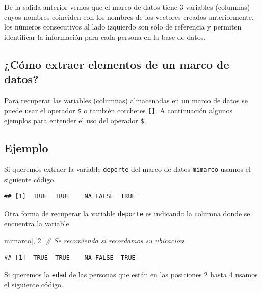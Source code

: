 \documentclass[10pt,]{krantz}
\makeatletter
\newenvironment{Shaded}{\begin{snugshade}}{\end{snugshade}}
\newcommand{\DecValTok}[1]{\textcolor[rgb]{0.00,0.00,0.81}{{#1}}}
\newcommand{\CommentTok}[1]{\textcolor[rgb]{0.56,0.35,0.01}{\textit{{#1}}}}
\newcommand{\NormalTok}[1]{{#1}}
\newenvironment{kframe}{%
\medskip{}
\setlength{\fboxsep}{.8em}
 \def\at@end@of@kframe{}%
 \ifinner\ifhmode%
  \def\at@end@of@kframe{\end{minipage}}%
  \begin{minipage}{\columnwidth}%
 \fi\fi%
 \def\FrameCommand##1{\hskip\@totalleftmargin \hskip-\fboxsep
 \colorbox{shadecolor}{##1}\hskip-\fboxsep
     \hskip-\linewidth \hskip-\@totalleftmargin \hskip\columnwidth}%
 \MakeFramed {\advance\hsize-\width
   \@totalleftmargin\z@ \linewidth\hsize
   \@setminipage}}%
 {\par\unskip\endMakeFramed%
 \at@end@of@kframe}
\renewenvironment{Shaded}{\begin{kframe}}{\end{kframe}}
\makeatother
\begin{document}
De la salida anterior vemos que el marco de datos tiene 3 variables
(columnas) cuyos nombres coinciden con los nombres de los vectores
creados anteriormente, los números consecutivos al lado izquierdo son
sólo de referencia y permiten identificar la información para cada
persona en la base de datos.

\subsection{¿Cómo extraer elementos de un marco de
datos?}\label{como-extraer-elementos-de-un-marco-de-datos}

Para recuperar las variables (columnas) almacenadas en un marco de datos
se puede usar el operador \texttt{\$} o también corchetes
\texttt{{[}{]}}. A continuación algunos ejemplos para entender el uso
del operador \texttt{\$}.

\subsection*{Ejemplo}\label{ejemplo-3}


Si queremos extraer la variable \texttt{deporte} del marco de datos
\texttt{mimarco} usamos el siguiente código.

\begin{Shaded}
\end{Shaded}

\begin{verbatim}
## [1]  TRUE  TRUE    NA FALSE  TRUE
\end{verbatim}

Otra forma de recuperar la variable \texttt{deporte} es indicando la
columna donde se encuentra la variable

\begin{Shaded}
\begin{Highlighting}[]
\NormalTok{mimarco[, }\DecValTok{2}\NormalTok{]  }\CommentTok{# Se recomienda si recordamos su ubicacion}
\end{Highlighting}
\end{Shaded}

\begin{verbatim}
## [1]  TRUE  TRUE    NA FALSE  TRUE
\end{verbatim}

Si queremos la \texttt{edad} de las personas que están en las posiciones
2 hasta 4 usamos el siguiente código.
\end{document}
